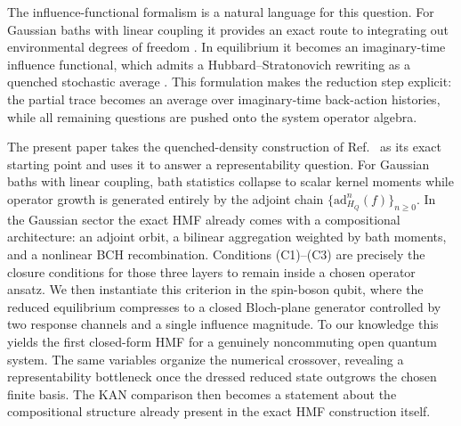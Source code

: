 The influence-functional formalism is a natural language for this question. For
Gaussian baths with linear coupling it provides an exact route to integrating
out environmental degrees of freedom
\cite{feynmanTheoryGeneralQuantum1963a,caldeiraQuantumTunnellingDissipative1983a,grabertQuantumBrownianMotion1988}.
In equilibrium it becomes an imaginary-time influence functional, which admits
a Hubbard--Stratonovich rewriting as a quenched stochastic average
\cite{hubbardCalculationPartitionFunctions1959a,stratonovich1957QDistro,stockburgerExactNumberRepresentation2002}.
This formulation makes the reduction step explicit: the partial trace becomes
an average over imaginary-time back-action histories, while all remaining
questions are pushed onto the system operator algebra.

The present paper takes the quenched-density construction of
Ref.~\cite{mccaulMeanForceHamiltoniansInfluence2026} as its exact starting
point and uses it to answer a representability question. For Gaussian baths
with linear coupling, bath statistics collapse to scalar kernel moments while
operator growth is generated entirely by the adjoint chain
$\{\mathrm{ad}_{H_Q}^n(f)\}_{n\geq 0}$. In the Gaussian sector the exact HMF
already comes with a compositional architecture: an adjoint orbit, a bilinear
aggregation weighted by bath moments, and a nonlinear BCH recombination.
Conditions (C1)--(C3) are precisely the closure conditions for those three
layers to remain inside a chosen operator ansatz. We then instantiate this
criterion in the spin-boson qubit, where the reduced equilibrium compresses to
a closed Bloch-plane generator controlled by two response channels and a single
influence magnitude. To our knowledge this yields the first closed-form HMF for
a genuinely noncommuting open quantum system. The same variables organize the
numerical crossover, revealing a representability bottleneck once the dressed
reduced state outgrows the chosen finite basis. The KAN comparison then
becomes a statement about the compositional structure already present in the
exact HMF construction itself.
